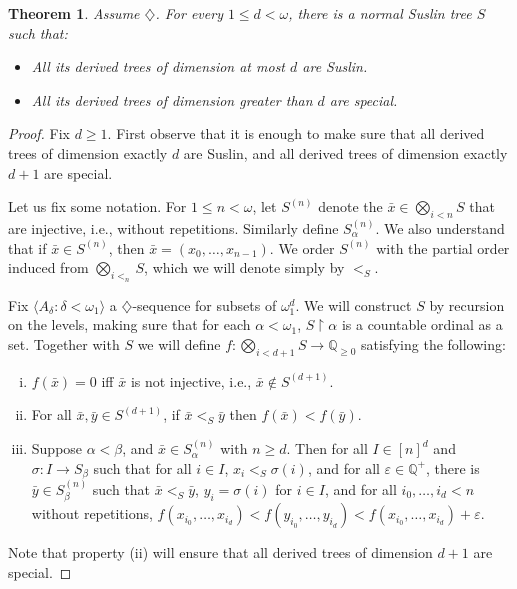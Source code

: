 \documentclass{amsart}
\newtheorem{theorem}{Theorem}[section]
\theoremstyle{definition}
\newcommand{\Q}{\mathbb{Q}}
\newcommand{\res}{\restriction}
\newcommand{\tup}[1]{\langle#1\rangle}
\begin{document}
\begin{theorem}\label{thm:diamond-S}
  Assume $\diamondsuit$. For every $1 \le d < \omega$,
  there is a normal Suslin tree
  $S$ such that:
  \begin{itemize}
    \item All its derived trees of dimension at most $d$ are
    Suslin.
    \item All its derived trees of dimension greater than $d$
    are special.
  \end{itemize}

\end{theorem}
\begin{proof}
  Fix $d \ge 1$. First observe  that it is enough to make sure that all derived
  trees of dimension exactly $d$ are Suslin, and all derived trees
  of dimension exactly $d+1$ are special.

  Let us fix some notation. For $1 \le n < \omega$, let
  $S^{(n)}$ denote the $\bar{x} \in \bigotimes_{i < n}S$ that
  are injective, i.e., without repetitions. Similarly
  define $S^{(n)}_{\alpha}$. We also understand that
  if $\bar{x} \in S^{(n)}$, then $\bar{x} = (x_{0},\dots,x_{n-1})$.
  We order $S^{(n)}$ with the partial order induced
  from $\bigotimes_{i<_{n}}S$, which we will denote simply
  by $<_{S}$.

  Fix $\tup{A_{\delta} : \delta < \omega_{1}}$ a $\diamondsuit$-sequence
  for subsets of $\omega_{1}^{d}$.
  We will construct $S$ by recursion on the levels, making
  sure that for each $\alpha < \omega_{1}$,
  $S\res \alpha$ is a countable ordinal as a set.
  Together with $S$ we will define
  $f : \bigotimes_{i < d+1}S \to \Q_{\ge 0}$ satisfying the following:
  \begin{enumerate}[(i)]
    \item $f(\bar{x}) = 0$ iff $\bar{x}$ is not injective, i.e.,
    $\bar{x} \notin S^{(d+1)}$.
    \item For all $\bar{x},\bar{y} \in S^{(d+1)}$,
    if $\bar{x} <_{S} \bar{y}$ then $f(\bar{x}) < f(\bar{y})$.
    \item Suppose $\alpha < \beta$, and
    $\bar{x} \in S_{\alpha}^{(n)}$ with $n \ge d$. Then for all
    $I \in [n]^{d}$ and $\sigma : I \to S_{\beta}$ such that
    for all $i \in I$, $x_{i} <_{S} \sigma(i)$, and for
    all $\varepsilon \in \Q^{+}$, there is
    $\bar{y} \in S_{\beta}^{(n)}$ such that $\bar{x} <_{S} \bar{y}$,
    $y_{i} = \sigma(i)$ for $i \in I$,
    and for all $i_{0},\dots,i_{d} < n$ without
    repetitions,
    $f(x_{i_{0}},\dots,x_{i_{d}}) < f(y_{i_{0}},\dots,y_{i_{d}})
    < f(x_{i_{0}},\dots,x_{i_{d}}) + \varepsilon$.
  \end{enumerate}
  Note that property (ii) will ensure that all derived trees of
  dimension $d+1$ are special.


\end{proof}
\end{document}
